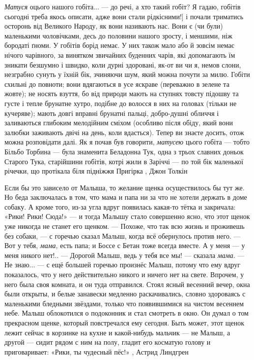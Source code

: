 \emph{Матуся} оцього нашого гобіта... — до речі, а хто такий гобіт? Я гадаю, гобітів
сьогодні треба якось описати, адже вони стали рідкісними!] і почали триматись
осторонь від Великого Народу, як вони називають нас. Вони є (чи були)
маленькими чоловічками, десь до половини нашого зросту, і меншими, ніж бородаті
ґноми. У гобітів борід немає. У них також мало або й зовсім немає нічого
чарівного, за винятком звичайних буденних чарів, які допомагають їм зникати
безшумно і швидко, коли дурні здоровані, як-от ви чи я, немов слони, незграбно
сунуть у їхній бік, зчиняючи шум, який можна почути за милю. Гобіти схильні до
повноти; вони вдягаються в усе яскраве (переважно в зелене та жовте); не носять
взуття, бо від природи мають на ступнях товсту підошву та густе і тепле
брунатне хутро, подібне до волосся в них на головах (тільки не кучеряве); мають
довгі вправні брунатні пальці, добро-душні обличчя і заливаються глибоким
мелодійним сміхом (особливо після обіду, який вони залюбки заживають двічі на
день, коли вдасться). Тепер ви знаєте досить, отож можна розповідати далі. Як я
почав був говорити, \emph{матусею} цього гобіта — тобто Більбо Торбина — була
знаменита Беладонна Тук, одна з трьох славних доньок Старого Тука, старійшини
гобітів, котрі жили в Заріччі — по той бік маленької річечки, що протікала біля
підніжжя Пригірка
, Джон Толкін

Если бы это зависело от Малыша, то желание щенка осуществилось бы тут же. Но
беда заключалась в том, что мама и папа ни за что не хотели держать в доме
собаку. А кроме того, из-за угла вдруг появилась какая-то тётка и закричала:
«Рики! Рики! Сюда!» — и тогда Малышу стало совершенно ясно, что этот щенок уже
никогда не станет его щенком.  — Похоже, что так всю жизнь и проживешь без
собаки, — с горечью сказал Малыш, когда всё обернулось против него. — Вот у
тебя, \emph{мама}, есть папа; и Боссе с Бетан тоже всегда вместе. А у меня — у
меня никого нет!..  — Дорогой Малыш, ведь у тебя все мы! — сказала \emph{мама}.
— Не знаю... — с ещё большей горечью произнёс Малыш, потому что ему вдруг
показалось, что у него действительно никого и ничего нет на свете.  Впрочем, у
него была своя комната, и он туда отправился.  Стоял ясный весенний вечер, окна
были открыты, и белые занавески медленно раскачивались, словно здороваясь с
маленькими бледными звёздами, только что появившимися на чистом весеннем небе.
Малыш облокотился о подоконник и стал смотреть в окно. Он думал о том
прекрасном щенке, который повстречался ему сегодня. Быть может, этот щенок
лежит сейчас в корзинке на кухне и какой-нибудь мальчик — не Малыш, а другой —
сидит рядом с ним на полу, гладит его косматую голову и приговаривает: «Рики,
ты чудесный пёс!»
, Астрид Линдгрен
